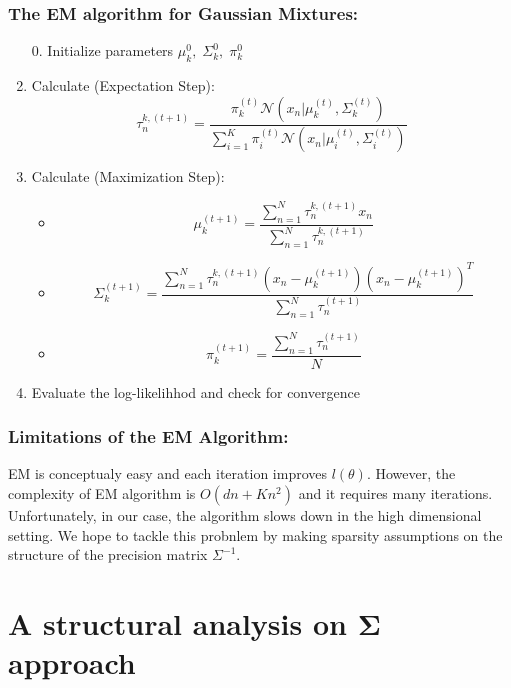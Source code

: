 \documentclass[12pt]{article}
\def\bSigma{\boldsymbol\Sigma}
\begin{document}
\subsubsection{The EM algorithm for Gaussian Mixtures:}
\begin{enumerate}
\item[0.] Initialize parameters $\mu_k^0,\; \Sigma_k^0,\;\pi_k^0$
\item Calculate (Expectation Step):
\begin{equation}
\tau_n^{k,(t+1)}=\frac{\pi_k^{(t)} \mathcal N(x_n|\mu_k^{(t)},\Sigma_k^{(t)})}{\sum_{i=1}^K\pi_i^{(t)}\mathcal N(x_n|\mu_i^{(t)},\Sigma_i^{(t)})}
\end{equation}
\item Calculate (Maximization Step):
\begin{itemize}
\item
\begin{equation}
\mu_k^{(t+1)}=\frac{\sum_{n=1}^N\tau_n^{k,(t+1)} x_n}{\sum_{n=1}^N\tau_n^{k,(t+1)}}
\end{equation}
\item
\begin{equation}
\Sigma_k^{(t+1)}=\frac{\sum_{n=1}^N \tau_n^{k,(t+1)} (x_n-\mu_k^{(t+1)})(x_n-\mu_k^{(t+1)})^T}{\sum_{n=1}^N\tau_n^{(t+1)}}
\end{equation}
\item
\begin{equation}
\pi_k^{(t+1)}=\frac{\sum_{n=1}^N\tau_n^{(t+1)}}{N}
\end{equation}
\end{itemize}
\item Evaluate the log-likelihhod and check for convergence
\end{enumerate}

\subsubsection{Limitations of the EM Algorithm:}

EM is conceptualy easy and each iteration improves $l(\theta)$. However, the complexity of EM algorithm is $O(dn+Kn^2)$ and it requires many iterations. Unfortunately, in our case, the algorithm slows down in the high dimensional setting. We hope to tackle this probnlem by making sparsity assumptions on the structure of the precision matrix $\Sigma^{-1}$.

\section{A structural analysis on $\bSigma$ approach}
\end{document}
